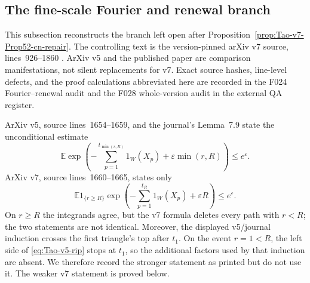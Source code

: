 \subsection{The fine-scale Fourier and renewal branch}

This subsection reconstructs the branch left open after
Proposition~\ref{prop:Tao-v7-Prop52-cn-repair}.  The controlling text is the
version-pinned arXiv v7 source, lines~926--1860
\cite{Tao2026v7}.  ArXiv v5 and the published paper are comparison
manifestations, not silent replacements for v7.  Exact source hashes,
line-level defects, and the proof calculations abbreviated here are recorded
in the F024 Fourier--renewal audit and the F028 whole-version audit in the
external QA register.

\begin{sourceissue}
\label{sourceissue:Tao-v5-v7-many-triangles}
ArXiv v5, source lines~1654--1659, and the journal's Lemma~7.9 state the
unconditional estimate
\begin{equation}
\label{eq:Tao-v5-rip}
 \mathbb E\exp\left(
 -\sum_{p=1}^{t_{\min(r,R)}}1_W(X_p)
 +\varepsilon\min(r,R)\right)\le e^\varepsilon.
\end{equation}
ArXiv v7, source lines~1660--1665, states only
\begin{equation}
\label{eq:Tao-v7-rip}
 \mathbb E1_{\{r\ge R\}}
 \exp\left(-\sum_{p=1}^{t_R}1_W(X_p)+\varepsilon R\right)
 \le e^\varepsilon.
\end{equation}
On \(r\ge R\) the integrands agree, but the v7 formula deletes every path
with \(r<R\); the two statements are not identical.  Moreover, the displayed
v5/journal induction crosses the first triangle's top after \(t_1\).  On the
event \(r=1<R\), the left side of \eqref{eq:Tao-v5-rip} stops at \(t_1\), so
the additional factors used by that induction are absent.  We therefore
record the stronger statement as printed but do not use it.  The weaker v7
statement is proved below.
\end{sourceissue}

